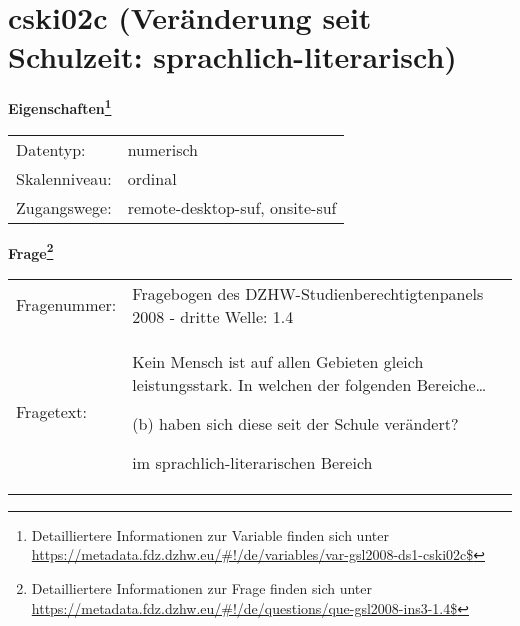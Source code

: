 
    \setcounter{footnote}{0}

    \vspace*{-1.8cm}
	\section{cski02c (Veränderung seit Schulzeit: sprachlich-literarisch)}
	\label{section:cski02c}



    \vspace*{0.5cm}
    \noindent\textbf{Eigenschaften\footnote{Detailliertere Informationen zur Variable finden sich unter
		\url{https://metadata.fdz.dzhw.eu/\#!/de/variables/var-gsl2008-ds1-cski02c$}}}\\
	\begin{tabularx}{\hsize}{@{}lX}
	Datentyp: & numerisch \\
	Skalenniveau: & ordinal \\
	Zugangswege: &
	  remote-desktop-suf, 
	  onsite-suf
 \\
    \end{tabularx}



				\vspace*{0.5cm}
                \noindent\textbf{Frage\footnote{Detailliertere Informationen zur Frage finden sich unter
		              \url{https://metadata.fdz.dzhw.eu/\#!/de/questions/que-gsl2008-ins3-1.4$}}}\\
				\begin{tabularx}{\hsize}{@{}lX}
					Fragenummer: &
					  Fragebogen des DZHW-Studienberechtigtenpanels 2008 - dritte Welle:
					  1.4
 \\
					Fragetext: & Kein Mensch ist auf allen Gebieten gleich leistungsstark. In welchen der folgenden Bereiche…\par  (b) haben sich diese seit der Schule verändert?\par  im sprachlich-literarischen Bereich \\
				\end{tabularx}





